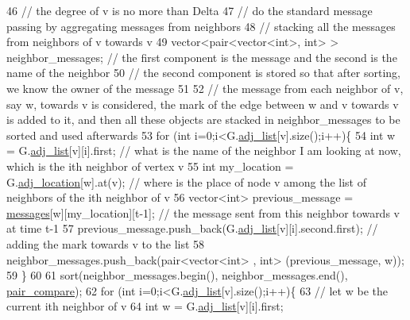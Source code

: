 \begin{DoxyCode}
46         \textcolor{comment}{// the degree of v is no more than Delta}
47         \textcolor{comment}{// do the standard message passing by aggregating messages from neighbors}
48         \textcolor{comment}{// stacking all the messages from neighbors of v towards v}
49         vector<pair<vector<int>, \textcolor{keywordtype}{int}> > neighbor\_messages; \textcolor{comment}{// the first component is the message and the
       second is the name of the neighbor}
50         \textcolor{comment}{// the second component is stored so that after sorting, we know the owner of the message}
51 
52         \textcolor{comment}{// the message from each neighbor of v, say w,  towards v is considered, the mark of the edge
       between w and v towards v is added to it, and then all these objects are stacked in neighbor\_messages to be
       sorted and used afterwards }
53         \textcolor{keywordflow}{for} (\textcolor{keywordtype}{int} i=0;i<G.\hyperlink{classmarked__graph_a1a0bf7ca413a278763f7c878b3b6fd6f}{adj\_list}[v].size();i++)\{
54           \textcolor{keywordtype}{int} w = G.\hyperlink{classmarked__graph_a1a0bf7ca413a278763f7c878b3b6fd6f}{adj\_list}[v][i].first; \textcolor{comment}{// what is the name of the neighbor I am looking at now,
       which is the ith neighbor of vertex v }
55           \textcolor{keywordtype}{int} my\_location = G.\hyperlink{classmarked__graph_a3ae722ea9583ad23af34d789a88ac01a}{adj\_location}[w].at(v); \textcolor{comment}{// where is the place of node v among the
       list of neighbors of the ith neighbor of v}
56           vector<int> previous\_message = \hyperlink{classgraph__message_a06a1d1ab91b4891c65ea80205566f800}{messages}[w][my\_location][t-1]; \textcolor{comment}{// the message sent from
       this neighbor towards v at time t-1}
57           previous\_message.push\_back(G.\hyperlink{classmarked__graph_a1a0bf7ca413a278763f7c878b3b6fd6f}{adj\_list}[v][i].second.first); \textcolor{comment}{// adding the mark towards v
       to the list}
58           neighbor\_messages.push\_back(pair<vector<int> , \textcolor{keywordtype}{int}> (previous\_message, w));
59         \}
60 
61         sort(neighbor\_messages.begin(), neighbor\_messages.end(), \hyperlink{graph__message_8cpp_a7ffcf0e75a9eec8eb0b05c92ead511de}{pair\_compare});
62         \textcolor{keywordflow}{for} (\textcolor{keywordtype}{int} i=0;i<G.\hyperlink{classmarked__graph_a1a0bf7ca413a278763f7c878b3b6fd6f}{adj\_list}[v].size();i++)\{
63           \textcolor{comment}{// let w be the current ith neighbor of v}
64           \textcolor{keywordtype}{int} w = G.\hyperlink{classmarked__graph_a1a0bf7ca413a278763f7c878b3b6fd6f}{adj\_list}[v][i].first;

\end{DoxyCode}
